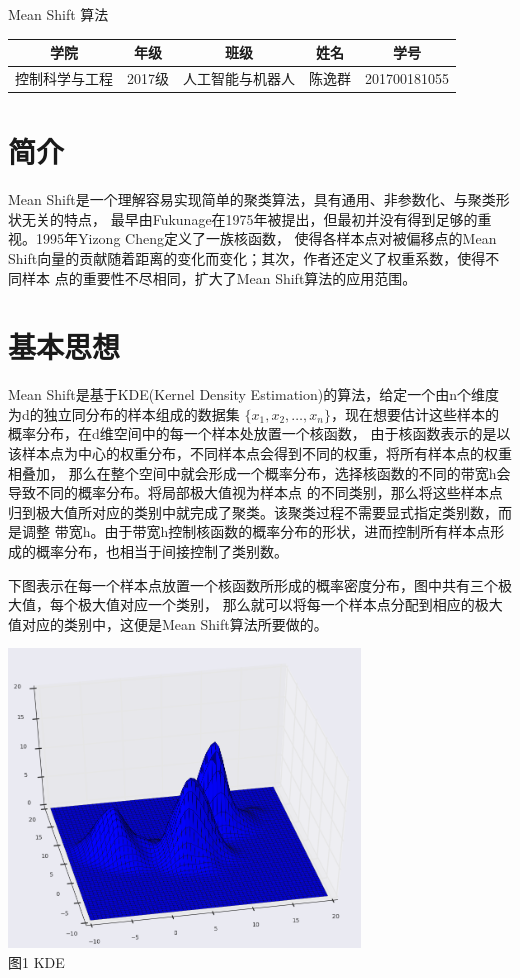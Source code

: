 \documentclass{article}
\begin{document}
\begin{center}
    Mean Shift 算法
\end{center}
\begin{center}
\begin{tabular}{c c c c c}
    \hline
    \hline
    学院 & 年级 & 班级 & 姓名 & 学号 \\
    \hline
    控制科学与工程 & 2017级 & 人工智能与机器人 & 陈逸群 & 201700181055 \\
    \hline
    \hline
\end{tabular}
\end{center}
\tableofcontents
\newpage
\section{简介}
Mean Shift是一个理解容易实现简单的聚类算法，具有通用、非参数化、与聚类形状无关的特点，
最早由Fukunage在1975年被提出，但最初并没有得到足够的重视。1995年Yizong Cheng定义了一族核函数，
使得各样本点对被偏移点的Mean Shift向量的贡献随着距离的变化而变化；其次，作者还定义了权重系数，使得不同样本
点的重要性不尽相同，扩大了Mean Shift算法的应用范围。

\section{基本思想}
Mean Shift是基于KDE(Kernel Density Estimation)的算法，给定一个由n个维度为d的独立同分布的样本组成的数据集
$ \{x_1, x_2, \ldots, x_n\} $，现在想要估计这些样本的概率分布，在d维空间中的每一个样本处放置一个核函数，
由于核函数表示的是以该样本点为中心的权重分布，不同样本点会得到不同的权重，将所有样本点的权重相叠加，
那么在整个空间中就会形成一个概率分布，选择核函数的不同的带宽h会导致不同的概率分布。将局部极大值视为样本点
的不同类别，那么将这些样本点归到极大值所对应的类别中就完成了聚类。该聚类过程不需要显式指定类别数，而是调整
带宽h。由于带宽h控制核函数的概率分布的形状，进而控制所有样本点形成的概率分布，也相当于间接控制了类别数。

下图表示在每一个样本点放置一个核函数所形成的概率密度分布，图中共有三个极大值，每个极大值对应一个类别，
那么就可以将每一个样本点分配到相应的极大值对应的类别中，这便是Mean Shift算法所要做的。

\begin{center}
    \includegraphics[width=0.7\textwidth]{Images/example_kde_2.png} \\

    图1 KDE
\end{center}
\end{document}
